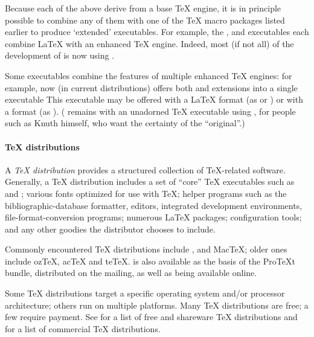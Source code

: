 Because each of the above derive from a base \TeX{} engine, it is in
principle possible to combine any of them with one of the \TeX{} macro
packages listed earlier to produce `extended' executables.  For
example, the ,  and
 executables each combine \LaTeX{} with an enhanced
\TeX{} engine.  Indeed, most (if not all) of the development of
\context{} is now using \luatex{}.

Some executables combine the features of multiple enhanced \TeX{}
engines: for example,  now (in current distributions)
offers both \PDFTeX{} and \eTeX{} extensions into a single executable
This executable may be offered with a \LaTeX{} format (as
 or ) or with a \plaintex{} format
(as ).  ( remains with an unadorned
\TeX{} executable using \plaintex{}, for people such as Knuth himself,
who want the certainty of the ``original''.)

\paragraph{\TeX{} distributions}
A \emph{\TeX{} distribution} provides a structured collection of
\TeX{}-related software.  Generally, a \TeX{} distribution includes a
set of ``core'' \TeX{} executables such as  and
; various fonts optimized for use with \TeX{}; helper
programs such as the \BibTeX{} bibliographic-database formatter,
editors, integrated development environments, file-format-conversion
programs; numerous \LaTeX{} packages; configuration tools; and any
other goodies the distributor chooses to include.

Commonly encountered \TeX{} distributions include \texlive{},
\miktex{} and Mac\TeX{}; older ones include oz\TeX{},
ac\TeX{} and te\TeX{}.  \miktex{} is also available as the
basis of the Pro\TeX{}t bundle, distributed on the \texlive{}
 mailing, as well as being available online.

Some \TeX{} distributions target a specific operating system and/or
processor architecture; others run on multiple platforms.  Many \TeX{}
distributions are free; a few require payment.  See %
 for a
list of free and shareware \TeX{} distributions and %
 for a
list of commercial \TeX{} distributions.

